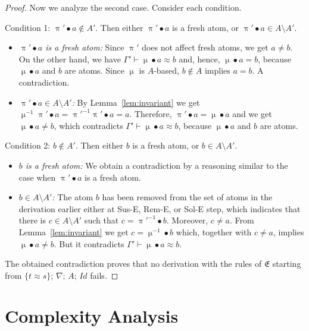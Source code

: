 \documentclass[11pt,a4paper]{amsart}
\theoremstyle{definition}
\newcommand{\idp}{\mathit{Id}}
\newcommand{\perm}{\approx}
\newcommand{\permef}{\bullet}
\newcommand\ppi{\uppi}
\newcommand\pmu{\upmu}
\newcommand{\msys}{\mathfrak{E}}
\newcommand{\Atoms}{A}
\newcommand{\nablai}{{\nabla}}
\newcommand{\nablag}{\Gamma}
\begin{document}
\begin{proof}
   Now we analyze the second case. Consider each condition.

   Condition 1: $\ppi'\permef a\notin A'$. Then either
   $\ppi'\permef a$ is a fresh atom, or $\ppi'\permef a
   \in A\setminus A'$.
\begin{itemize}
  \item \emph{$\ppi'\permef a$ is a fresh atom:} Since $\ppi'$ does
    not affect fresh atoms, we get $a \neq b$. On the other hand, we
    have $\nablag' \vdash \pmu \permef a \approx b$ and, hence, $\pmu
    \permef a = b$, because $\pmu \permef a$ and $b$ are atoms.  Since
    $\pmu$ is $A$-based, $b\notin A$ implies $a=b$. A contradiction.
  \item \emph{$\ppi'\permef a \in A\setminus A'$:} By
    Lemma~\ref{lem:invariant} we get $\pmu^{-1}\ppi' \permef a =
    \ppi'^{-1}\ppi' \permef a = a$. Therefore, $\ppi'\permef a
    =\pmu\permef a$ and we get $\pmu \permef a \neq b$, which
    contradicts $\nablag' \vdash \pmu \permef a \approx b$, because
    $\pmu\permef a$ and $b$ are atoms.
\end{itemize}

Condition 2: $b \notin A'$. Then either $b$ is a fresh atom, or $b \in A\setminus A'$.
\begin{itemize}
  \item \emph{$b$ is a fresh atom:} We obtain a contradiction by a
    reasoning similar to the case when $\ppi'\permef a$ is a
    fresh atom.
  \item \emph{$b \in A\setminus A'$:} The atom $b$ has been removed
    from the set of atoms in the derivation earlier either at {\sf
      Sus-E}, {\sf Rem-E}, or {\sf Sol-E} step, which indicates that
    there is $c\in A\setminus A'$ such that $c=\ppi'^{-1}\permef
    b$. Moreover, $c\neq a$. From Lemma~\ref{lem:invariant} we get
    $c=\pmu^{-1} \permef b$ which, together with $c\neq a$, implies
    $\pmu \permef a \neq b$. But it contradicts $\nablag' \vdash
    \pmu\permef a \approx b$.
\end{itemize}

   The obtained contradiction proves that no derivation with the rules
   of $\msys$ starting from $ \{t\perm s\}
   ;\,\allowbreak \nablai ;\,\allowbreak \Atoms ;\,\allowbreak \idp$
   fails.
\end{proof}


\section{Complexity Analysis}
\end{document}
